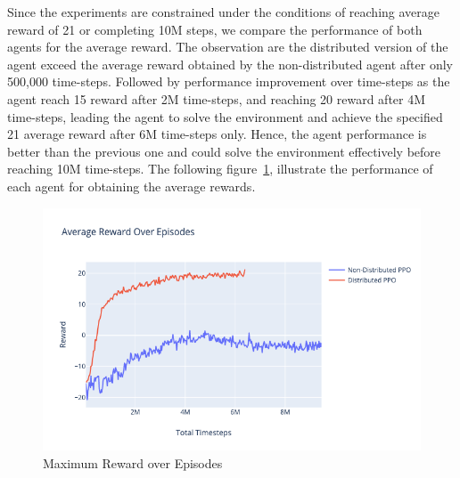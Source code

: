 Since the experiments are constrained under the conditions of reaching average reward of 21 or completing 10M steps, we compare the performance of both agents for the average reward. The observation are the distributed version of the agent exceed the average reward obtained by the non-distributed agent after only 500,000 time-steps. Followed by performance improvement over time-steps as the agent reach 15 reward after 2M time-steps, and reaching 20 reward after 4M time-steps, leading the agent to solve the environment and achieve the specified 21 average reward after 6M time-steps only. Hence, the agent performance is better than the previous one and could solve the environment effectively before reaching 10M time-steps. The following figure~\ref{fig:2nd_exp_avg_eps_reward}, illustrate the performance of each agent for obtaining the average rewards.
\begin{figure}[!htb]
    \centering
    \includegraphics[width=\linewidth]{figures/exps/2nd_exp/avg_eps_reward.png}
    \caption{Maximum Reward over Episodes}
    \label{fig:2nd_exp_avg_eps_reward}
\end{figure}

